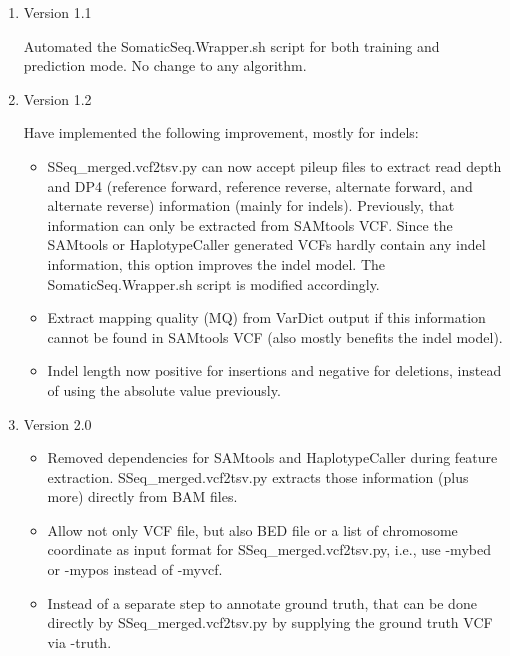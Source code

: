 \documentclass[10pt,letterpaper]{article}
\begin{document}
\begin{sloppypar}
\begin{enumerate}
	
	
	\item Version 1.1
	
		Automated the SomaticSeq.Wrapper.sh script for both training and prediction mode. No change to any algorithm. 
	
	
	
	\item Version 1.2
	
		Have implemented the following improvement, mostly for indels:
		
		\begin{itemize}
		 
		  \item 
		  SSeq\_merged.vcf2tsv.py can now accept pileup files to extract read depth and DP4 (reference forward, reference reverse, alternate forward, and alternate reverse) information (mainly for indels). Previously, that information can only be extracted from SAMtools VCF. Since the SAMtools or HaplotypeCaller generated VCFs hardly contain any indel information, this option improves the indel model. The SomaticSeq.Wrapper.sh script is modified accordingly.
		 
		  \item
		  Extract mapping quality (MQ) from VarDict output if this information cannot be found in SAMtools VCF (also mostly benefits the indel model). 
		 
		  \item
		  Indel length now positive for insertions and negative for deletions, instead of using the absolute value previously. 
	 
	\end{itemize}
	
	
	
	\item Version 2.0
	
		\begin{itemize}
		  \item
		  Removed dependencies for SAMtools and HaplotypeCaller during feature extraction. SSeq\_merged.vcf2tsv.py extracts those information (plus more) directly from BAM files.
		
		  \item
		  Allow not only VCF file, but also BED file or a list of chromosome coordinate as input format for SSeq\_merged.vcf2tsv.py, i.e., use -mybed or -mypos instead of -myvcf. 
		
		  \item
		  Instead of a separate step to annotate ground truth, that can be done directly by SSeq\_merged.vcf2tsv.py by supplying the ground truth VCF via -truth.
		

\end{itemize}
\end{enumerate}
\end{sloppypar}
\end{document}
